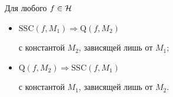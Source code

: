 \begin{thms}


Для любого $f\in {\cal H}$ 


\begin{itemize}


\item[(i)] $\mathrm{SSC}(f, M_1) \Rightarrow \mathrm Q(f, M_2)$


с константой $M_2$, зависящей лишь от $M_1;$


\item[(ii)] $\mathrm Q(f, M_2) \Rightarrow \mathrm{SSC}(f, M_1)$


с константой $M_1$, зависящей лишь от $M_2$. 


\end{itemize}


\end{thms}





